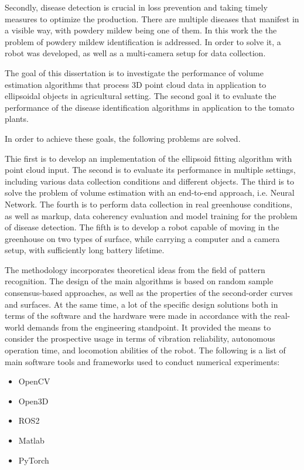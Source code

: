 Secondly, disease detection is crucial in loss prevention and taking timely measures to optimize the production.
There are multiple diseases that manifest in a visible way, with powdery mildew being one of them.
In this work the the problem of powdery mildew identification is addressed.
In order to solve it, a robot was developed, as well as a multi-camera setup for data collection.


The goal of this dissertation is to investigate the performance of volume estimation algorithms that process 3D point cloud data in application to ellipsoidal objects in agricultural setting.
The second goal it to evaluate the performance of the disease identification algorithms in application to the tomato plants.

In order to achieve these goals, the following problems are solved.

Thie first is to develop an implementation of the ellipsoid fitting algorithm with point cloud input.
The second is to evaluate its performance in multiple settings, including various data collection conditions and different objects.
The third is to solve the problem of volume estimation with an end-to-end approach, i.e. Neural Network.
The fourth is to perform data collection in real greenhouse conditions, as well as markup, data coherency evaluation and model training for the problem of disease detection.
The fifth is to develop a robot capable of moving in the greenhouse on two types of surface, while carrying a computer and a camera setup, with sufficiently long battery lifetime.


The methodology incorporates theoretical ideas from the field of pattern recognition.
The design of the main algorithms is based on random sample consensus-based approaches, as well as the properties of the second-order curves and surfaces.
At the same time, a lot of the specific design solutions both in terms of the software and the hardware were made in accordance with the real-world demands from the engineering standpoint.
It provided the means to consider the prospective usage in terms of vibration reliability, autonomous operation time, and locomotion abilities of the robot.
The following is a list of main software tools and frameworks used to conduct numerical experiments:
\begin{itemize}
    \item OpenCV
    \item Open3D
    \item ROS2
    \item Matlab
    \item PyTorch
\end{itemize}

